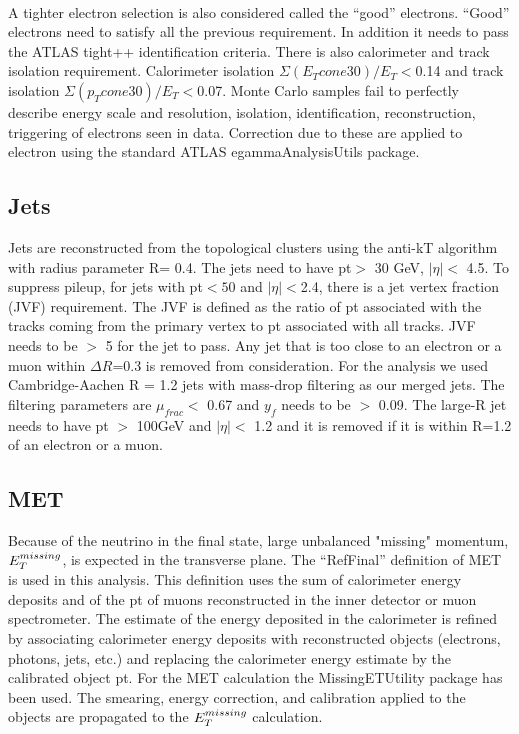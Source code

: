 \paragraph{}
A tighter electron selection is also considered called the “good” electrons. “Good” electrons need to satisfy all the previous requirement. In addition it needs to pass the ATLAS tight++ identification criteria. There is also calorimeter and track isolation requirement. Calorimeter isolation $\Sigma(E_{T}cone30)/E_{T} <$0.14 and track isolation $\Sigma(p_{T}cone30)/E_{T} <$0.07.
Monte Carlo samples fail to perfectly describe energy scale and resolution, isolation, identification, reconstruction, triggering of electrons seen in data. Correction due to these are applied to electron using the standard ATLAS egammaAnalysisUtils package.


\subsection{Jets}
Jets are reconstructed from the topological clusters using the anti-kT algorithm with radius parameter R= 0.4. The jets need to have pt$>$ 30 GeV, $ |\eta| <$ 4.5.  To suppress pileup, for jets with pt$<50$ and $ |\eta| <$2.4, there is a jet vertex fraction (JVF) requirement. The JVF is defined as the ratio of pt associated with the tracks coming from the primary vertex to pt associated with all tracks. JVF needs to be $>$ 5 for the jet to pass. Any jet that is too close to an electron or a muon within $ \Delta R $=0.3 is removed from consideration. 
For the analysis we used Cambridge-Aachen R = 1.2 jets with mass-drop filtering as our merged jets. The filtering parameters are $\mu_{frac}< $  0.67 and $y_{f}$  needs to be $>$ 0.09. The large-R jet needs to have pt $>$ 100GeV and $|\eta| <$ 1.2 and it is removed if it is within R=1.2 of an electron or a muon. 

\subsection{MET}
Because of the neutrino in the final state, large unbalanced "missing" momentum, $E_{T}^{missing}$, is expected 
in the transverse plane. The ``RefFinal'' definition of MET is used in this analysis.  This definition uses the 
sum of calorimeter energy deposits and of the pt of muons reconstructed in the inner detector or muon spectrometer.
The estimate of the energy deposited in the calorimeter is refined by associating calorimeter energy deposits with 
reconstructed objects (electrons, photons, jets, etc.) and replacing the calorimeter energy estimate by the 
calibrated object pt. For the MET calculation the  MissingETUtility package has been used. 
The smearing, energy correction, and calibration applied to the objects are propagated to the $E_{T}^{missing}$ calculation. 